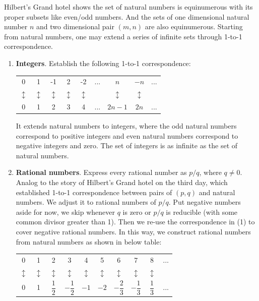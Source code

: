 \documentclass[b5paper]{article}
\begin{document}
Hilbert's Grand hotel shows the set of natural numbers is equinumerous with its proper subsets like even/odd numbers. And the sets of one dimensional natural number $n$ and two dimensional pair $(m, n)$ are also equinumerous. Starting from natural numbers, one may extend a series of infinite sets through 1-to-1 correspondence.

\begin{enumerate}[(1)]
\item \textbf{Integers}. Establish the following 1-to-1 correspondence:

\begin{tabular}{ccccccccc}
0 & 1 & -1 & 2 & -2 & ... & $n$ & $-n$ & ... \\
$\updownarrow$ & $\updownarrow$ & $\updownarrow$ & $\updownarrow$ & $\updownarrow$ & & $\updownarrow$ & $\updownarrow$ & \\
0 & 1 &  2 & 3 &  4 & ... & $2n - 1$ & $2n$ & ... \\
\end{tabular}

It extends natural numbers to integers, where the odd natural numbers correspond to positive integers and even natural numbers correspond to negative integers and zero. The set of integers is as infinite as the set of natural numbers.

\item \textbf{Rational numbers}. Express every rational number as $p/q$, where $q \ne 0$. Analog to the story of Hilbert's Grand hotel on the third day, which established 1-to-1 correspondence between pairs of $(p, q)$ and natural numbers. We adjust it to rational numbers of $p/q$. Put negative numbers aside for now, we skip whenever $q$ is zero or $p/q$ is reducible (with some common divisor greater than 1). Then we re-use the correspondence in (1) to cover negative rational numbers. In this way, we construct rational numbers from natural numbers as shown in below table:

\begin{tabular}{cccccccccc}
0 & 1 & 2 & 3 & 4 & 5 & 6 & 7 & 8 & ... \\
$\updownarrow$ & $\updownarrow$ & $\updownarrow$ & $\updownarrow$ & $\updownarrow$ & $\updownarrow$ & $\updownarrow$ & $\updownarrow$ & $\updownarrow$ & \\
0 & 1 & $\dfrac{1}{2}$ & $-\dfrac{1}{2}$ & $-1$ & $-2$ & $-\dfrac{2}{3}$ & $-\dfrac{1}{3}$ & $\dfrac{1}{3}$ & ... \\
\end{tabular}


\end{enumerate}
\end{document}
